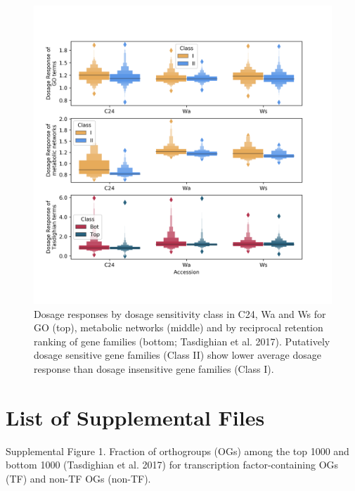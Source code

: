 \documentclass[11pt]{article}
\begin{document}
\begin{figure}[h!]
    \includegraphics[width=\linewidth]{../figures/all_dr_boxen.png}
 \caption{Dosage responses by dosage sensitivity class in C24, Wa and Ws for GO (top), metabolic networks (middle) and by reciprocal retention ranking of gene families (bottom; Tasdighian et al. 2017). Putatively dosage sensitive gene families (Class II) show lower average dosage response than dosage insensitive gene families (Class I).}
  \label{fig4}
\end{figure}

%


\section*{List of Supplemental Files}
Supplemental Figure 1. Fraction of orthogroups (OGs) among the top 1000 and bottom 1000 (Tasdighian et al. 2017) for transcription factor-containing OGs (TF) and non-TF OGs (non-TF).
\end{document}
